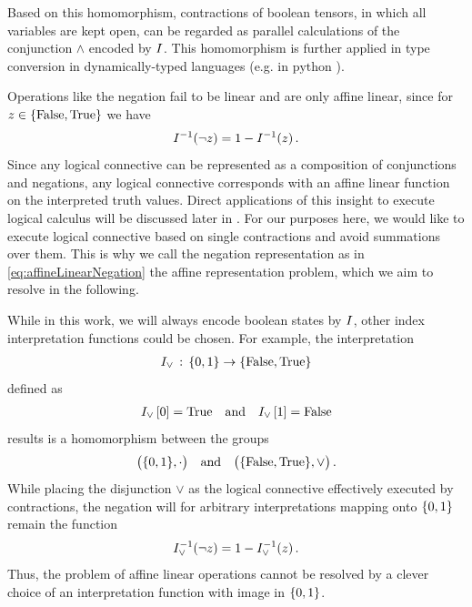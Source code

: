 Based on this homomorphism, contractions of boolean tensors, in which all variables are kept open, can be regarded as parallel calculations of the conjunction $\land$ encoded by $I$.
This homomorphism is further applied in type conversion in dynamically-typed languages (e.g. in $\mathrm{python}$ \cite{foundation_python_2025}).

Operations like the negation fail to be linear and are only affine linear, since for $z\in\{\mathrm{False},\mathrm{True}\}$ we have
\begin{align}
    \label{eq:affineLinearNegation}
    I^{-1}(\lnot z) = 1 - I^{-1}(z)  \, .
\end{align}
Since any logical connective can be represented as a composition of conjunctions and negations, any logical connective corresponds with an affine linear function on the interpreted truth values.
Direct applications of this insight to execute logical calculus will be discussed later in .
For our purposes here, we would like to execute logical connective based on single contractions and avoid summations over them.
This is why we call the negation representation as in \eqref{eq:affineLinearNegation} the affine representation problem, which we aim to resolve in the following.

While in this work, we will always encode boolean states by $I$, other index interpretation functions could be chosen.
For example, the interpretation
\begin{align*}
    I_{\lor} \,:\, \{0,1\}\rightarrow\{\mathrm{False},\mathrm{True}\}
\end{align*}
defined as
\begin{align*}
    I_{\lor}\left[0\right] = \mathrm{True} \quad\text{and}\quad I_{\lor}\left[1\right] = \mathrm{False}
\end{align*}
results is a homomorphism between the groups
\begin{align*}
    \big(\{0,1\},\cdot\big) \quad\text{and}\quad \big(\{\mathrm{False},\mathrm{True}\},\lor\big)  \, .
\end{align*}
While placing the disjunction $\lor$ as the logical connective effectively executed by contractions, the negation will for arbitrary interpretations mapping onto $\{0,1\}$ remain the function %
\begin{align*}
    I_{\lor}^{-1}(\lnot z) = 1 - I_{\lor}^{-1}(z)  \, .
\end{align*}
Thus, the problem of affine linear operations cannot be resolved by a clever choice of an interpretation function with image in $\{0,1\}$.

